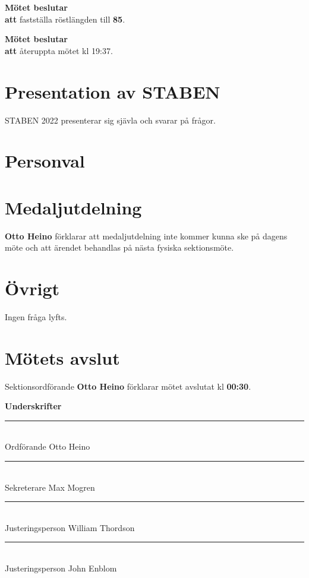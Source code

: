 \documentclass{datateknologsektionen-document}
\newcommand{\ind}{\hspace*{2em}}
\newcommand{\motetbeslutar}{\textbf{Mötet beslutar}}
\newcommand{\att}{\\\ind\textbf{att}}
\begin{document}
\motetbeslutar\att{} fastställa röstlängden till \textbf{85}.

\motetbeslutar\att{} återuppta mötet kl 19:37.

\section{Presentation av STABEN}
STABEN 2022 presenterar sig sjävla och svarar på frågor.



\pagebreak
\section{Personval}


\section{Medaljutdelning}
\textbf{Otto Heino} förklarar att medaljutdelning inte kommer kunna ske på dagens möte och att ärendet behandlas på nästa fysiska sektionsmöte.

\section{Övrigt}
Ingen fråga lyfts.

\section{Mötets avslut}
Sektionsordförande \textbf{Otto Heino} förklarar mötet avslutat kl \textbf{00:30}.




\pagebreak
{\Large\bfseries Underskrifter}

\vspace*{1.2cm}
\noindent\rule{8cm}{1pt}\\
Ordförande Otto Heino

\vspace*{1.2cm}
\noindent\rule{8cm}{1pt}\\
Sekreterare Max Mogren

\vspace*{1.2cm}
\noindent\rule{8cm}{1pt}\\
Justeringsperson William Thordson

\vspace*{1.2cm}
\noindent\rule{8cm}{1pt}\\
Justeringsperson John Enblom
\end{document}
